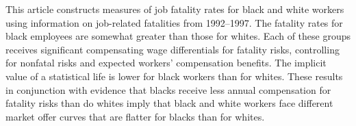 This article constructs measures of job fatality rates for black and white workers using information on job-related fatalities from 1992--1997. The fatality rates for black employees are somewhat greater than those for whites. Each of these groups receives significant compensating wage differentials for fatality risks, controlling for nonfatal risks and expected workers' compensation benefits. The implicit value of a statistical life is lower for black workers than for whites. These results in conjunction with evidence that blacks receive less annual compensation for fatality risks than do whites imply that black and white workers face different market offer curves that are flatter for blacks than for whites.